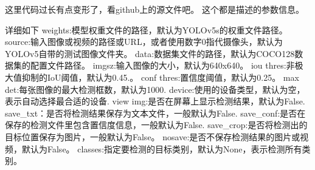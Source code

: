 这里代码过长有点变形了，看github上的源文件吧。
这个都是描述的参数信息。

详细如下
weights:模型权重文件的路径，默认为YOLOv5s的权重文件路径。
source:输入图像或视频的路径或URL，或者使用数字0指代摄像头，默认为YOLOv5自带的测试图像文件夹。
data:数据集文件的路径，默认为COCO128数据集的配置文件路径。
imgsz:输入图像的大小，默认为640x640。
iou thres:非极大值抑制的IoU阈值，默认为0.45.。
conf thres:置信度阈值，默认为0.25。
max det:每张图像的最大检测框数，默认为1000.
device:使用的设备类型，默认为空，表示自动选择最合适的设备.
view img:是否在屏幕上显示检测结果，默认为False.
save_txt：是否将检测结果保存为文本文件，一般默认为False.
save_conf:是否在保存的检测文件里包含置信度信息，一般默认为False.
save_crop:是否将检测出的目标位置保存为图片，一般默认为False。
nosave:是否不保存检测结果的图片或视频，默认为False。
classes:指定要检测的目标类别，默认为None，表示检测所有类别。